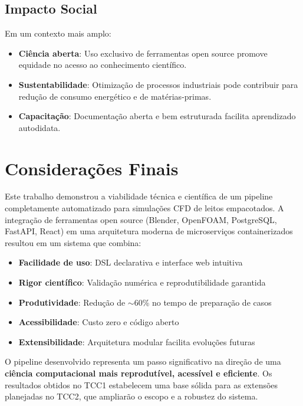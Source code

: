 \subsection{Impacto Social}

Em um contexto mais amplo:

\begin{itemize}
    \item \textbf{Ciência aberta}: Uso exclusivo de ferramentas open source promove equidade no acesso ao conhecimento científico.
    
    \item \textbf{Sustentabilidade}: Otimização de processos industriais pode contribuir para redução de consumo energético e de matérias-primas.
    
    \item \textbf{Capacitação}: Documentação aberta e bem estruturada facilita aprendizado autodidata.
\end{itemize}

\section{Considerações Finais}

Este trabalho demonstrou a viabilidade técnica e científica de um pipeline completamente automatizado para simulações CFD de leitos empacotados. A integração de ferramentas open source (Blender, OpenFOAM, PostgreSQL, FastAPI, React) em uma arquitetura moderna de microserviços containerizados resultou em um sistema que combina:

\begin{itemize}
    \item \textbf{Facilidade de uso}: DSL declarativa e interface web intuitiva
    \item \textbf{Rigor científico}: Validação numérica e reprodutibilidade garantida
    \item \textbf{Produtividade}: Redução de $\sim$60\% no tempo de preparação de casos
    \item \textbf{Acessibilidade}: Custo zero e código aberto
    \item \textbf{Extensibilidade}: Arquitetura modular facilita evoluções futuras
\end{itemize}

O pipeline desenvolvido representa um passo significativo na direção de uma \textbf{ciência computacional mais reprodutível, acessível e eficiente}. Os resultados obtidos no TCC1 estabelecem uma base sólida para as extensões planejadas no TCC2, que ampliarão o escopo e a robustez do sistema.


